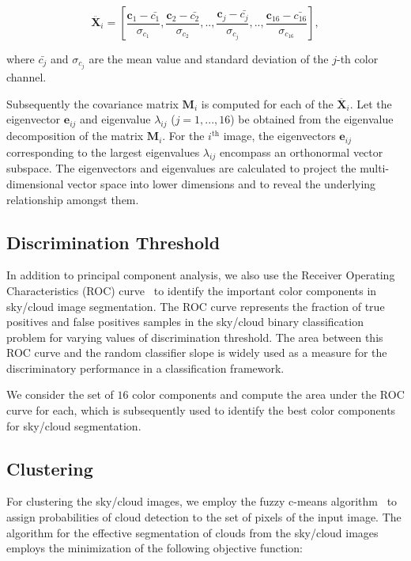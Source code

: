\begin{equation}
\label{eq:eq3}
\ddot{\textbf{X}_{i}}= [\frac{\textbf{c}_{1}-\bar{c_{1}}}{\sigma_{c_{1}}}, \frac{\textbf{c}_{2}-\bar{c_{2}}}{\sigma_{c_{2}}},..,\frac{\textbf{c}_{j}-\bar{c_{j}}}{\sigma_{c_{j}}},..,\frac{\textbf{c}_{16}-\bar{c_{16}}}{\sigma_{c_{16}}}],
\end{equation}

where $\bar{c_{j}}$ and $\sigma_{c_{j}}$ are the mean value and standard deviation of the $j$-th color channel. 

Subsequently the covariance matrix $\textbf{M}_{i}$ is computed for each of the $\ddot{\textbf{X}_{i}}$. Let the eigenvector $\textbf{e}_{ij}$ and eigenvalue $\lambda_{ij}$ ($j=1,...,16$) be obtained from the eigenvalue decomposition of the matrix $\textbf{M}_{i}$. For the $i^\textrm{th}$ image, the eigenvectors $\textbf{e}_{ij}$ corresponding to the largest eigenvalues $\lambda_{ij}$ encompass an orthonormal vector subspace. The eigenvectors and eigenvalues are calculated to project the multi-dimensional vector space into lower dimensions and to reveal the underlying relationship amongst them. 

\subsection{Discrimination Threshold}
\label{sec:bimodality}
In addition to principal component analysis, we also use the Receiver Operating Characteristics (ROC) curve~\cite{ROC_main,microarray-ROC} to identify the important color components in sky/cloud image segmentation. The ROC curve represents the fraction of true positives and false positives samples in the sky/cloud binary classification problem for varying values of discrimination threshold. The area between this ROC curve and the random classifier slope is widely used as a measure for the discriminatory performance in a classification framework. 

We consider the set of $16$ color components and compute the area under the ROC curve for each, which is subsequently used to identify the best color components for sky/cloud segmentation.

\subsection{Clustering}
\label{sec:cloudcluster}
For clustering the sky/cloud images, we employ the fuzzy c-means algorithm~\cite{Bezdek,Jawahar} to assign probabilities of cloud detection to the set of pixels of the input image. The algorithm for the effective segmentation of clouds from the sky/cloud images employs the minimization of the following objective function:

